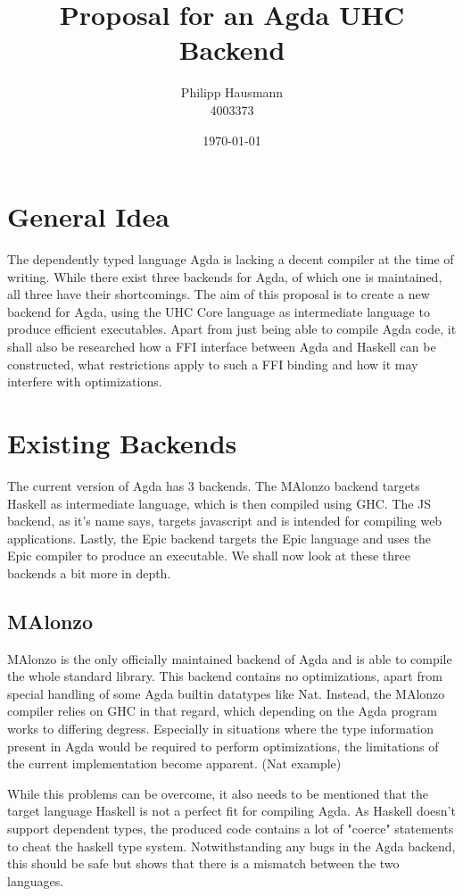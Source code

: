 \documentclass[12pt, a4paper, twoside]{report}
\title{Proposal for an Agda UHC Backend}
\author{Philipp Hausmann \\
    4003373 \\
    }
\date{\today}
\begin{document}
\maketitle

\tableofcontents

\chapter{General Idea}
The dependently typed language Agda is lacking a decent compiler at the time of writing. While there
exist three backends for Agda, of which one is maintained, all three have their shortcomings.
The aim of this proposal is to create a new backend for Agda, using the UHC Core language
as intermediate language to produce efficient executables. Apart from just being able to compile
Agda code, it shall also be researched how a FFI interface between Agda and Haskell can be constructed,
what restrictions apply to such a FFI binding and how it may interfere with optimizations.

\chapter{Existing Backends}
The current version of Agda has 3 backends. The MAlonzo backend targets Haskell as intermediate
language, which is then compiled using GHC. The JS backend, as it's name says, targets javascript
and is intended for compiling web applications. Lastly, the Epic backend targets the Epic language
and uses the Epic compiler to produce an executable.
We shall now look at these three backends a bit more in depth.
\section{MAlonzo}
MAlonzo is the only officially maintained backend of Agda and is able to compile the whole standard
library. This backend contains no optimizations, apart from special handling of some Agda builtin
datatypes like Nat. Instead, the MAlonzo compiler relies on GHC in that regard, which depending
on the Agda program works to differing degress. Especially in situations where the type information
present in Agda would be required to perform optimizations, the limitations of the current implementation
become apparent. (Nat example)

While this problems can be overcome, it also needs to be mentioned that the target language Haskell
is not a perfect fit for compiling Agda. As Haskell doesn't support dependent types, the produced
code contains a lot of "coerce" statements to cheat the haskell type system. Notwithstanding any
bugs in the Agda backend, this should be safe but shows that there is a mismatch between the
two languages.
\end{document}
